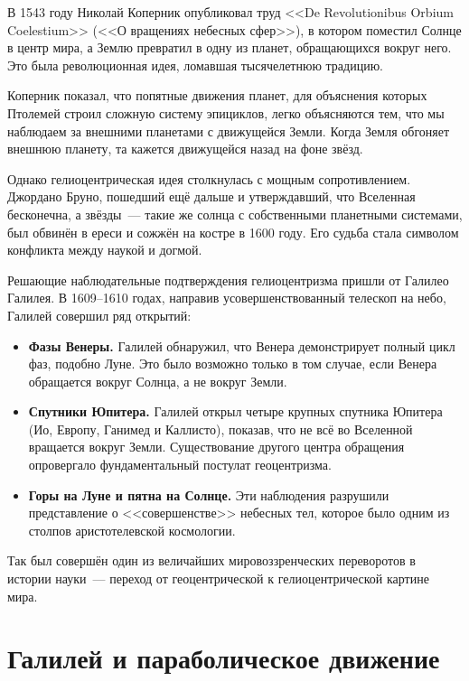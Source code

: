 \documentclass[12pt,a4paper]{article}
\begin{document}
В 1543 году Николай Коперник опубликовал труд <<De Revolutionibus Orbium
Coelestium>> (<<О вращениях небесных сфер>>), в котором поместил Солнце в
центр мира, а Землю превратил в одну из планет, обращающихся вокруг него.
Это была революционная идея, ломавшая тысячелетнюю традицию.

Коперник показал, что попятные движения планет, для объяснения которых
Птолемей строил сложную систему эпициклов, легко объясняются тем, что мы
наблюдаем за внешними планетами с движущейся Земли. Когда Земля обгоняет
внешнюю планету, та кажется движущейся назад на фоне звёзд.

Однако гелиоцентрическая идея столкнулась с мощным сопротивлением. Джордано
Бруно, пошедший ещё дальше и утверждавший, что Вселенная бесконечна, а
звёзды~--- такие же солнца с собственными планетными системами, был обвинён
в ереси и сожжён на костре в 1600 году. Его судьба стала символом конфликта
между наукой и догмой.

Решающие наблюдательные подтверждения гелиоцентризма пришли от Галилео
Галилея. В 1609--1610 годах, направив усовершенствованный телескоп на небо,
Галилей совершил ряд открытий:
\begin{itemize}
  \item \textbf{Фазы Венеры.} Галилей обнаружил, что Венера демонстрирует
    полный цикл фаз, подобно Луне. Это было возможно только в том случае,
    если Венера обращается вокруг Солнца, а не вокруг Земли.
  \item \textbf{Спутники Юпитера.} Галилей открыл четыре крупных спутника
    Юпитера (Ио, Европу, Ганимед и Каллисто), показав, что не всё во
    Вселенной вращается вокруг Земли. Существование другого центра
    обращения опровергало фундаментальный постулат геоцентризма.
  \item \textbf{Горы на Луне и пятна на Солнце.} Эти наблюдения разрушили
    представление о <<совершенстве>> небесных тел, которое было одним из
    столпов аристотелевской космологии.
\end{itemize}

Так был совершён один из величайших мировоззренческих переворотов в истории
науки~--- переход от геоцентрической к гелиоцентрической картине мира.

\section{Галилей и параболическое движение}
\end{document}
